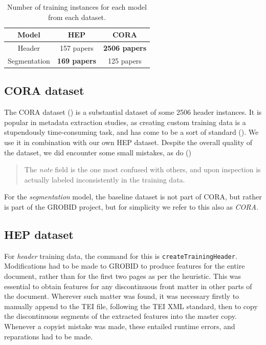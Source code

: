 \begin{table}[h]
\begin{center}
\begin{tabular}{|c|c|c|}
\hline
Model & HEP & CORA \\
\hline
Header & 157 papers & \textbf{2506 papers} \\
\hline
Segmentation & \textbf{169 papers} & 125 papers \\
\hline
\end{tabular}
\caption[Number of training instances for each model from each dataset.]{Number of training instances for each model from each dataset.}
\label{table:headervssegmentation}
\end{center}
\end{table}

\subsection{CORA dataset}
\label{subsec:cora}
The CORA dataset (\cite{mccallum2000automating}) is a substantial dataset of some 2506 header instances. It is popular in metadata extraction studies, as creating custom training data is a stupendously time-consuming task, and has come to be a sort of standard (\cite{Peng04accurateinformation}). We use it in combination with our own HEP dataset. Despite the overall quality of the dataset, we did encounter some small mistakes, as do (\cite{Peng04accurateinformation}) \blockquote{The \emph{note} field is the one most confused with others, and upon inspection is actually labeled inconsistently in the training data.} For the \emph{segmentation} model, the baseline dataset is not part of CORA, but rather is part of the GROBID project, but for simplicity we refer to this also as \emph{CORA}.

\subsection{HEP dataset}
\label{subsec:hepdatasetheader}

For \emph{header} training data, the command for this is \texttt{createTrainingHeader}. Modifications had to be made to GROBID to produce features for the entire document, rather than for the first two pages as per the heuristic. This was essential to obtain features for any discontinuous front matter in other parts of the document. Wherever such matter was found, it was necessary firstly to manually append to the TEI file, following the TEI XML standard, then to copy the discontinuous segments of the extracted features into the master copy. Whenever a copyist mistake was made, these entailed runtime errors, and reparations had to be made.

